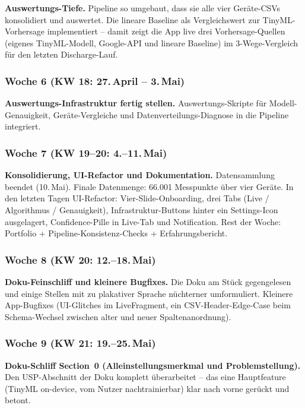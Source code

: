\documentclass[12pt, a4paper, ngerman]{article}
\begin{document}
\textbf{Auswertungs-Tiefe.}
Pipeline so umgebaut, dass sie alle vier Geräte-CSVs konsolidiert
und auswertet. Die lineare Baseline als Vergleichswert zur
TinyML-Vorhersage implementiert -- damit zeigt die App live drei
Vorhersage-Quellen (eigenes TinyML-Modell, Google-API und lineare
Baseline) im 3-Wege-Vergleich für den letzten Discharge-Lauf.

\subsubsection*{Woche 6 (KW 18: 27.\,April -- 3.\,Mai)}

\textbf{Auswertungs-Infrastruktur fertig stellen.}
Auswertungs-Skripte für Modell-Genauigkeit, Geräte-Vergleiche und
Datenverteilungs-Diagnose in die Pipeline integriert.

\subsubsection*{Woche 7 (KW 19--20: 4.--11.\,Mai)}

\textbf{Konsolidierung, UI-Refactor und Dokumentation.}
Datensammlung beendet (10.\,Mai). Finale Datenmenge:
66.001 Messpunkte über vier Geräte. In den letzten Tagen
UI-Refactor: Vier-Slide-Onboarding, drei Tabs (Live / Algorithmus
/ Genauigkeit), Infrastruktur-Buttons hinter ein Settings-Icon
ausgelagert, Confidence-Pille in Live-Tab und Notification. Rest
der Woche: Portfolio + Pipeline-Konsistenz-Checks +
Erfahrungsbericht.

\subsubsection*{Woche 8 (KW 20: 12.--18.\,Mai)}

\textbf{Doku-Feinschliff und kleinere Bugfixes.}
Die Doku am Stück gegengelesen und einige Stellen mit zu
plakativer Sprache nüchterner umformuliert. Kleinere App-Bugfixes
(UI-Glitches im LiveFragment, ein CSV-Header-Edge-Case beim
Schema-Wechsel zwischen alter und neuer Spaltenanordnung).

\subsubsection*{Woche 9 (KW 21: 19.--25.\,Mai)}

\textbf{Doku-Schliff Section~0 (Alleinstellungsmerkmal und
Problemstellung).}
Den USP-Abschnitt der Doku komplett überarbeitet -- das eine
Hauptfeature (TinyML on-device, vom Nutzer nachtrainierbar) klar
nach vorne gerückt und betont.
\end{document}

